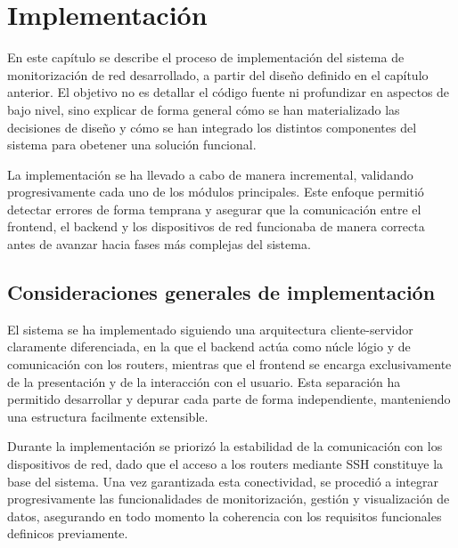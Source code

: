 
\chapter{Implementación}

En este capítulo se describe el proceso de implementación del sistema de monitorización de red desarrollado, a partir del diseño definido en el capítulo anterior. El objetivo no es detallar el código fuente ni profundizar en aspectos de bajo nivel, sino explicar de forma general cómo se han materializado las decisiones de diseño y cómo se han integrado los distintos componentes del sistema para obetener una solución funcional.

La implementación se ha llevado a cabo de manera incremental, validando progresivamente cada uno de los módulos principales. Este enfoque permitió detectar errores de forma temprana y asegurar que la comunicación entre el frontend, el backend y los dispositivos de red funcionaba de manera correcta antes de avanzar hacia fases más complejas del sistema.

\section{Consideraciones generales de implementación}

El sistema se ha implementado siguiendo una arquitectura cliente-servidor claramente diferenciada, en la que el backend actúa como núcle lógio y de comunicación con los routers, mientras que el frontend se encarga exclusivamente de la presentación y de la interacción con el usuario. Esta separación ha permitido desarrollar y depurar cada parte de forma independiente, manteniendo una estructura facilmente extensible.

Durante la implementación se priorizó la estabilidad de la comunicación con los dispositivos de red, dado que el acceso a los routers mediante SSH constituye la base del sistema. Una vez garantizada esta conectividad, se procedió a integrar progresivamente las funcionalidades de monitorización, gestión y visualización de datos, asegurando en todo momento la coherencia con los requisitos funcionales definicos previamente.

